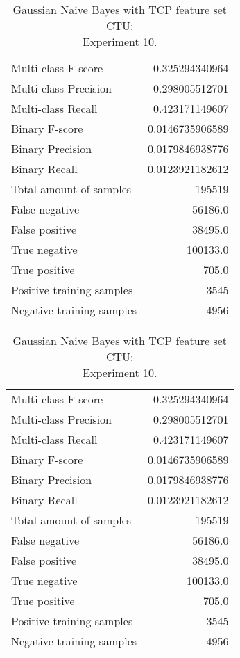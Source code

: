 \begin{table}[H]
\begin{minipage}{0.5\textwidth}
\caption{Gaussian Naive Bayes with TCP feature set CTU: \\Experiment 9.}
\centering
\begin{tabular}{l r}
\toprule
Multi-class F-score & 0.325294340964 \\
Multi-class Precision & 0.298005512701 \\
Multi-class Recall & 0.423171149607 \\
\midrule
Binary F-score & 0.0146735906589 \\
Binary Precision & 0.0179846938776 \\
Binary Recall & 0.0123921182612 \\
\midrule
Total amount of samples & 195519 \\
False negative & 56186.0 \\
False positive & 38495.0 \\
True negative & 100133.0 \\
True positive & 705.0 \\
\midrule
Positive training samples & 3545 \\
Negative training samples & 4956 \\
\bottomrule
\end{tabular}
\end{minipage}
\hfillx
\begin{minipage}{0.5\textwidth}
\caption{Gaussian Naive Bayes with TCP feature set CTU: \\Experiment 10.}
\centering
\begin{tabular}{l r}
\toprule
Multi-class F-score & 0.325294340964 \\
Multi-class Precision & 0.298005512701 \\
Multi-class Recall & 0.423171149607 \\
\midrule
Binary F-score & 0.0146735906589 \\
Binary Precision & 0.0179846938776 \\
Binary Recall & 0.0123921182612 \\
\midrule
Total amount of samples & 195519 \\
False negative & 56186.0 \\
False positive & 38495.0 \\
True negative & 100133.0 \\
True positive & 705.0 \\
\midrule
Positive training samples & 3545 \\
Negative training samples & 4956 \\
\bottomrule
\end{tabular}
\end{minipage}
\end{table}
